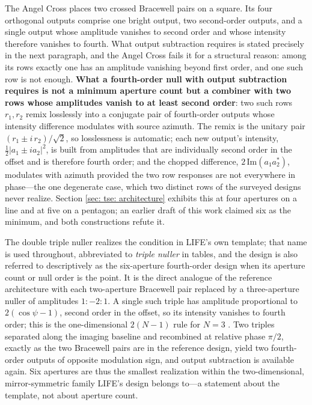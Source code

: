 \documentclass[12pt,a4paper]{article}
\numberwithin{equation}{section}
\numberwithin{figure}{section}
\numberwithin{table}{section}
\begin{document}
The Angel Cross \cite{angel1997searching} places two crossed Bracewell pairs \cite{bracewell1978nulling} on a square. Its four orthogonal outputs comprise one bright output, two second-order outputs, and a single output whose amplitude vanishes to second order and whose intensity therefore vanishes to fourth. What output subtraction requires is stated precisely in the next paragraph, and the Angel Cross fails it for a structural reason: among its rows exactly one has an amplitude vanishing beyond first order, and one such row is not enough. \textbf{What a fourth-order null with output subtraction requires is not a minimum aperture count but a combiner with two rows whose amplitudes vanish to at least second order}: two such rows $r_1, r_2$ remix losslessly into a conjugate pair of fourth-order outputs whose intensity difference modulates with source azimuth. The remix is the unitary pair $(r_1 \pm i\,r_2)/\sqrt{2}$, so losslessness is automatic; each new output's intensity, $\tfrac{1}{2}\lvert a_1 \pm i a_2\rvert^2$, is built from amplitudes that are individually second order in the offset and is therefore fourth order; and the chopped difference, $2\,\mathrm{Im}(a_1 a_2^{*})$, modulates with azimuth provided the two row responses are not everywhere in phase---the one degenerate case, which two distinct rows of the surveyed designs never realize. Section \ref{sec: tse: architecture} exhibits this at four apertures on a line and at five on a pentagon; an earlier draft of this work claimed six as the minimum, and both constructions refute it.

The double triple nuller realizes the condition in LIFE's own template; that name is used throughout, abbreviated to \emph{triple nuller} in tables, and the design is also referred to descriptively as the six-aperture fourth-order design when its aperture count or null order is the point. It is the direct analogue of the reference architecture with each two-aperture Bracewell pair replaced by a three-aperture nuller of amplitudes $1:-2:1$. A single such triple has amplitude proportional to $2(\cos\psi-1)$, second order in the offset, so its intensity vanishes to fourth order; this is the one-dimensional $2(N-1)$ rule for $N=3$ \cite{guyon2013beam}. Two triples separated along the imaging baseline and recombined at relative phase $\pi/2$, exactly as the two Bracewell pairs are in the reference design, yield two fourth-order outputs of opposite modulation sign, and output subtraction is available again. Six apertures are thus the smallest realization within the two-dimensional, mirror-symmetric family LIFE's design belongs to---a statement about the template, not about aperture count.
\end{document}

